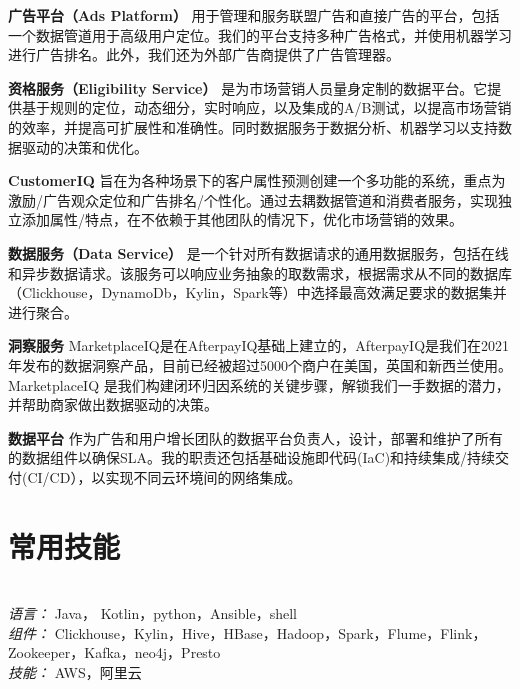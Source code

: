 \documentclass{res}[8.5pt]
\begin{document}
\begin{resume}
\vspace{-25pt}
{\bf 广告平台（Ads Platform）} 用于管理和服务联盟广告和直接广告的平台，包括一个数据管道用于高级用户定位。我们的平台支持多种广告格式，并使用机器学习进行广告排名。此外，我们还为外部广告商提供了广告管理器。

\vspace{-10pt}
{\bf 资格服务（Eligibility Service）} 是为市场营销人员量身定制的数据平台。它提供基于规则的定位，动态细分，实时响应，以及集成的A/B测试，以提高市场营销的效率，并提高可扩展性和准确性。同时数据服务于数据分析、机器学习以支持数据驱动的决策和优化。

\vspace{-10pt}
{\bf CustomerIQ} 旨在为各种场景下的客户属性预测创建一个多功能的系统，重点为激励/广告观众定位和广告排名/个性化。通过去耦数据管道和消费者服务，实现独立添加属性/特点，在不依赖于其他团队的情况下，优化市场营销的效果。

\vspace{-10pt}
{\bf 数据服务（Data Service）} 是一个针对所有数据请求的通用数据服务，包括在线和异步数据请求。该服务可以响应业务抽象的取数需求，根据需求从不同的数据库（Clickhouse，DynamoDb，Kylin，Spark等）中选择最高效满足要求的数据集并进行聚合。

\vspace{-10pt}
{\bf 洞察服务} MarketplaceIQ是在AfterpayIQ基础上建立的，AfterpayIQ是我们在2021年发布的数据洞察产品，目前已经被超过5000个商户在美国，英国和新西兰使用。MarketplaceIQ 是我们构建闭环归因系统的关键步骤，解锁我们一手数据的潜力，并帮助商家做出数据驱动的决策。

\vspace{-10pt}
{\bf 数据平台} 作为广告和用户增长团队的数据平台负责人，设计，部署和维护了所有的数据组件以确保SLA。我的职责还包括基础设施即代码(IaC)和持续集成/持续交付(CI/CD），以实现不同云环境间的网络集成。

\section{常用技能}
\vspace{-12pt}
\hrulefill\\
{\sl 语言：}  Java， Kotlin，python，Ansible，shell\\
{\sl 组件：} Clickhouse，Kylin，Hive，HBase，Hadoop，Spark，Flume，Flink，Zookeeper，Kafka，neo4j，Presto\\
{\sl 技能：} AWS，阿里云


\end{resume}
\end{document}
